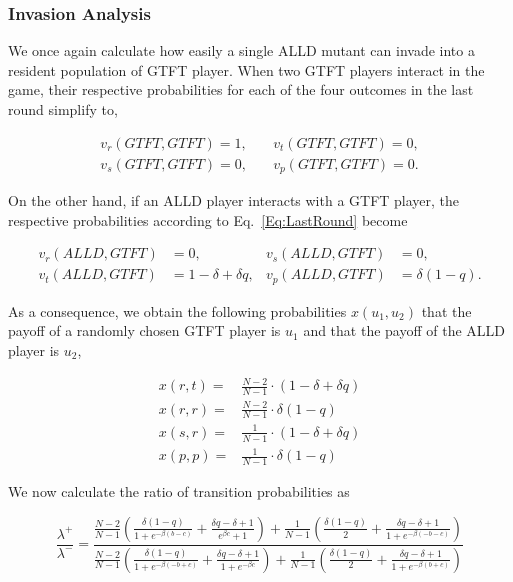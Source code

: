\documentclass[11pt]{article}
\theoremstyle{plainCl1}
\theoremstyle{plainCl2}
\begin{document}
\subsubsection*{Invasion Analysis}

We once again calculate how easily a single ALLD mutant can invade into a
resident population of GTFT player. When two GTFT players interact in the game,
their respective probabilities for each of the four outcomes in the last round
simplify to,

\begin{align*}
    v_{r}(GTFT,GTFT) = 1, & \quad v_{t}(GTFT,GTFT) = 0, \\
    v_{s}(GTFT,GTFT) = 0, & \quad v_{p}(GTFT,GTFT) = 0.
\end{align*}

On the other hand, if an ALLD player interacts with a GTFT player, the
respective probabilities according to Eq.~\ref{Eq:LastRound} become

\begin{align*}
    v_{r}(ALLD,GTFT) & = 0, &  v_{s}(ALLD,GTFT) & = 0, \\
    v_{t} (ALLD, GTFT ) & = 1 - \delta + \delta q, &  v_{p} (ALLD, GTFT) & = \delta(1 - q).
\end{align*}

As a consequence, we obtain the following probabilities \(x(u_1, u_2)\) that the
payoff of a randomly chosen GTFT player is \(u_1\) and that the payoff of the
ALLD player is \(u_2\),

\begin{align*}
  x(r, t) = & \frac{N - 2}{N - 1} \cdot (1 - \delta + \delta q)\\
  x(r, r) = & \frac{N - 2}{N - 1} \cdot \delta (1 - q) \\
  x(s, r) = & \frac{1}{N - 1} \cdot (1 - \delta + \delta q) \\
  x(p, p) = & \frac{1}{N - 1} \cdot \delta (1 - q)
\end{align*}

We now calculate the ratio of transition probabilities as

\begin{equation*}
\frac{\lambda^{+}}{\lambda^{-}} = \frac{ \frac{N - 2}{N - 1}  \left( \frac{ \delta  \left(1 - q \right)}{1
+ e^{-  \beta  \left(b - c \right)}} +  \frac{ \delta q -  \delta + 1}{e^{ \beta
c} + 1} \right)  +  \frac{1}{N-1}  \left(\frac{ \delta  \left(1 - q \right)}{2} +
 \frac{ \delta q -  \delta + 1}{1 + e^{-  \beta  \left(- b - c \right)}}\right)}
 { \frac{N - 2}{N - 1}  \left( \frac{ \delta  \left(1 - q \right)}{1 +
e^{-  \beta  \left(- b + c \right)}} +  \frac{ \delta q -  \delta + 1}{1 + e^{-
 \beta c}} \right) +  \frac{1}{N -1} \left(\frac{ \delta  \left(1 - q \right)}{2} +
 \frac{ \delta q -  \delta + 1}{1 + e^{-  \beta  \left(b + c \right)}}\right)}
\end{equation*}
\end{document}
